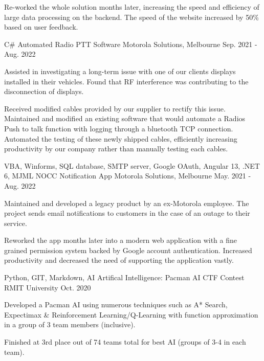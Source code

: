 \begin{cventries}
{\begin{cvitems}
        \item {Re-worked the whole solution months later, increasing the speed and efficiency of large data processing on the backend. The speed of the website increased by 50\% based on user feedback.}
      \end{cvitems}
    }
  \cventry
    {C\#}
    {Automated Radio PTT Software}
    {Motorola Solutions, Melbourne}
    {Sep. 2021 - Aug. 2022}
    {
      \begin{cvitems}
        \item {Assisted in investigating a long-term issue with one of our clients displays installed in their vehicles. Found that RF interference was contributing to the disconnection of displays.}
        \item {Received modified cables provided by our supplier to rectify this issue. Maintained and modified an existing software that would automate a Radios Push to talk function with logging through a bluetooth TCP connection. Automated the testing of these newly shipped cables, efficiently increasing productivity by our company rather than manually testing each cables.}
      \end{cvitems}
    }
  \cventry
    {VBA, Winforms, SQL database, SMTP server, Google OAuth, Angular 13, .NET 6, MJML}
    {NOCC Notification App}
    {Motorola Solutions, Melbourne}
    {May. 2021 - Aug. 2022}
    {
      \begin{cvitems}
        \item {Maintained and developed a legacy product by an ex-Motorola employee. The project sends email notifications to customers in the case of an outage to their service.}
        \item {Reworked the app months later into a modern web application with a fine grained permission system backed by Google account authentication. Increased productivity and decreased the need of supporting the application vastly.}
      \end{cvitems}
    }
  \cventry
    {Python, GIT, Markdown, AI}
    {Artifical Intelligence: Pacman AI CTF Contest}
    {RMIT University}
    {Oct. 2020}
    {
      \begin{cvitems}
        \item {Developed a Pacman AI using numerous techniques such as A* Search, Expectimax \& Reinforcement Learning/Q-Learning with function approximation in a group of 3 team members (inclusive).}
        \item {Finished at 3rd place out of 74 teams total for best AI (groups of 3-4 in each team).}
      \end{cvitems}
    }
\end{cventries}

